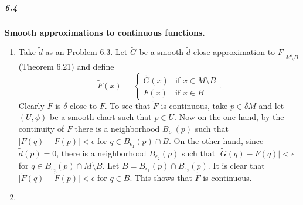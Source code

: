 \documentclass[10pt,letter]{article}
\begin{document}
\subparagraph{6.4} {\bf Smooth approximations to continuous functions.} 
\begin{enumerate}[label=(\alph*)]
\item Take $\tilde{d}$ as an Problem 6.3. Let $\tilde{G}$ be a smooth $\tilde{d}$-close approximation to $F \vert_{M \setminus B}$ (Theorem 6.21) and define
\[
\tilde{F}(x) = \begin{cases}
    \tilde{G}(x)  & \text{if } x \in M \setminus B  \\        
    F(x) & \text{if } x \in B 
\end{cases}.
\]
Clearly $\tilde{F}$ is $\delta$-close to $F$. To see that $\tilde{F}$ is continuous, take $p \in \delta M$ and let $(U,\phi)$ be a smooth chart such that $p \in U$. Now on the one hand, by the continuity of $F$ there is a neighborhood $B_{\epsilon_1}(p)$ such that $\vert F(q) - F(p) \vert < \epsilon$ for $q \in B_{\epsilon_1}(p) \cap B$. On the other hand, since  $\tilde{d}(p)  = 0$, there is a neighborhood $B_{\epsilon_2}(p)$ such that $\vert \tilde{G}(q) - F(q) \vert < \epsilon$ for $q \in B_{\epsilon_2}(p) \cap M \setminus B$. Let $B = B_{\epsilon_1}(p) \cap B_{\epsilon_2}(p)$. It is clear that $\vert \tilde{F}(q) - \tilde{F}(p) \vert < \epsilon$ for $q \in B$. This shows that $\tilde{F}$ is continuous. 
\item 
\end{enumerate}
\end{document}
